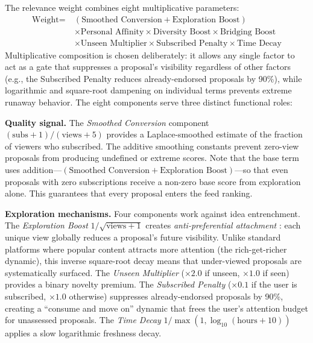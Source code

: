 \documentclass[a4paper, 12pt, twoside]{iviathesis}
\begin{document}
The relevance weight combines eight multiplicative parameters:
\begin{align*}
\text{Weight} =\ & (\text{Smoothed Conversion} + \text{Exploration Boost}) \\
&\times \text{Personal Affinity} \times \text{Diversity Boost} \times \text{Bridging Boost} \\
&\times \text{Unseen Multiplier} \times \text{Subscribed Penalty} \times \text{Time Decay}
\end{align*}
Multiplicative composition is chosen deliberately: it allows any single factor to act as a gate that suppresses a proposal's visibility regardless of other factors (e.g., the Subscribed Penalty reduces already-endorsed proposals by 90\%), while logarithmic and square-root dampening on individual terms prevents extreme runaway behavior.
The eight components serve three distinct functional roles:

\textbf{Quality signal.} The \textit{Smoothed Conversion} component $(\text{subs} + 1) / (\text{views} + 5)$ provides a Laplace-smoothed estimate of the fraction of viewers who subscribed. The additive smoothing constants prevent zero-view proposals from producing undefined or extreme scores. Note that the base term uses addition---$(\text{Smoothed Conversion} + \text{Exploration Boost})$---so that even proposals with zero subscriptions receive a non-zero base score from exploration alone. This guarantees that every proposal enters the feed ranking.

\textbf{Exploration mechanisms.} Four components work against idea entrenchment. The \textit{Exploration Boost} $1 / \sqrt{\text{views} + 1}$ creates \textit{anti-preferential attachment} \cite{barabasi1999}: each unique view globally reduces a proposal's future visibility. Unlike standard platforms where popular content attracts more attention (the rich-get-richer dynamic), this inverse square-root decay means that under-viewed proposals are systematically surfaced. The \textit{Unseen Multiplier} ($\times 2.0$ if unseen, $\times 1.0$ if seen) provides a binary novelty premium. The \textit{Subscribed Penalty} ($\times 0.1$ if the user is subscribed, $\times 1.0$ otherwise) suppresses already-endorsed proposals by 90\%, creating a ``consume and move on'' dynamic that frees the user's attention budget for unassessed proposals. The \textit{Time Decay} $1 / \max(1, \log_{10}(\text{hours} + 10))$ applies a slow logarithmic freshness decay.
\end{document}
